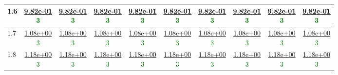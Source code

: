 \begin{table}[H]
\begin{tabular}{|l||c|c|c|c|c|c|c|c|c|}
\hline
 1.6 & \makecell{\ul{9.82e-01} \\ \textcolor{Green}{3}} & \makecell{\ul{9.82e-01} \\ \textcolor{Green}{3}} & \makecell{\ul{9.82e-01} \\ \textcolor{Green}{3}} & \makecell{\ul{9.82e-01} \\ \textcolor{Green}{3}} & \makecell{\ul{9.82e-01} \\ \textcolor{Green}{3}} & \makecell{\ul{9.82e-01} \\ \textcolor{Green}{3}} & \makecell{\ul{9.82e-01} \\ \textcolor{Green}{3}} & \makecell{\ul{9.82e-01} \\ \textcolor{Green}{3}} & \makecell{\ul{9.82e-01} \\ \textcolor{Green}{3}} \\
\hline
 1.7 & \makecell{\ul{1.08e+00} \\ \textcolor{Green}{3}} & \makecell{\ul{1.08e+00} \\ \textcolor{Green}{3}} & \makecell{\ul{1.08e+00} \\ \textcolor{Green}{3}} & \makecell{\ul{1.08e+00} \\ \textcolor{Green}{3}} & \makecell{\ul{1.08e+00} \\ \textcolor{Green}{3}} & \makecell{\ul{1.08e+00} \\ \textcolor{Green}{3}} & \makecell{\ul{1.08e+00} \\ \textcolor{Green}{3}} & \makecell{\ul{1.08e+00} \\ \textcolor{Green}{3}} & \makecell{\ul{1.08e+00} \\ \textcolor{Green}{3}} \\
\hline
 1.8 & \makecell{\ul{1.18e+00} \\ \textcolor{Green}{3}} & \makecell{\ul{1.18e+00} \\ \textcolor{Green}{3}} & \makecell{\ul{1.18e+00} \\ \textcolor{Green}{3}} & \makecell{\ul{1.18e+00} \\ \textcolor{Green}{3}} & \makecell{\ul{1.18e+00} \\ \textcolor{Green}{3}} & \makecell{\ul{1.18e+00} \\ \textcolor{Green}{3}} & \makecell{\ul{1.18e+00} \\ \textcolor{Green}{3}} & \makecell{\ul{1.18e+00} \\ \textcolor{Green}{3}} & \makecell{\ul{1.18e+00} \\ \textcolor{Green}{3}} \\

\end{tabular}
\end{table}
